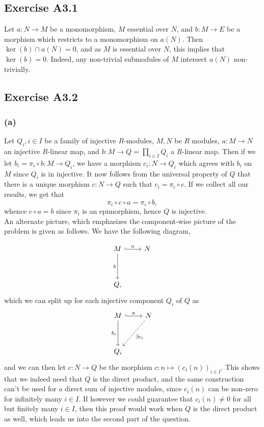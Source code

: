 \documentclass{article}
\theoremstyle{definition}
\begin{document}
\subsection*{Exercise A3.1}

Let $a : N \to M$ be a monomorphism, $M$ essential over $N$, and $b : M \to E$
be a morphism which restricts to a monomorphism on $a(N)$. Then $\ker(b) \cap
a(N) = 0$, and as $M$ is essential over $N$, this implies that $\ker(b) = 0$.
Indeed, any non-trivial submodules of $M$ intersect $a(N)$ non-trivially. 

\subsection*{Exercise A3.2}
\subsubsection*{(a)}

Let $Q_i, i \in I$ be a family of injective $R$-modules, $M, N$ be $R$ modules,
$a : M \to N$ an injective $R$-linear map, and $b : M \to Q = \prod_{i \in I}
Q_i$ a $R$-linear map. Then if we let $b_i = \pi_i \circ b : M \to Q_i$, we
have a morphism $c_i : N \to Q_i$ which agrees with $b_i$ on $M$ since $Q_i$ is
in injective. It now follows from the universal property of $Q$ that there is a
unique morphism $c : N \to Q$ such that $c_i = \pi_i \circ c$. If we collect
all our results, we get that
\[
	\pi_i \circ c \circ a = \pi_i \circ b,
\] 
whence $c \circ a = b$ since $\pi_i$ is an epimorphism, hence $Q$ is injective. \\

An alternate picture, which emphasizes the component-wise picture of the problem
is given as follows. We have the following diagram,

\begin{equation*}
\begin{tikzcd}[row sep=huge]
M \arrow[r, hook, "a"] \arrow[d,swap,"b"] &
N \\
Q,
\end{tikzcd}
\end{equation*}
which we can split up for each injective component $Q_i$ of $Q$ as
\begin{equation*}
\begin{tikzcd}[row sep=huge]
M \arrow[r, hook, "a"] \arrow[d,swap,"b_i"] &
N \arrow[dl, dashed, "\exists c_i"] \\
Q_i
\end{tikzcd}
\end{equation*}
and we can then let $c : N \to Q$ be the morphism $c : n \mapsto (c_i(n))_{i
\in I}$. This shows that we indeed need that $Q$ is the direct product, and the
same construction can't be used for a direct sum of injective modules, since
$c_i(n)$ can be non-zero for infinitely many $i \in I$. If however we could
guarantee that $c_i(n) \not = 0$ for all but finitely many $i \in I$, then this
proof would work when $Q$ is the direct product as well, which leads us into
the second part of the question. \\
\end{document}
